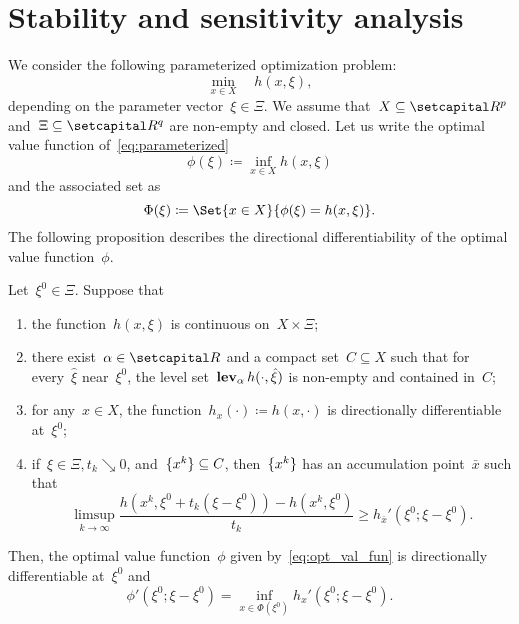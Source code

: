 \documentclass[../main]{subfiles}
\begin{document}
\section{Stability and sensitivity analysis}
We consider the following parameterized optimization problem:
\[ \label{eq:parameterized}
    \min_{x \in X} \quad h(x, \xi)
,\] 
depending on the parameter vector~$\xi \in \Xi$.
We assume that~$X \subseteq \setR^p$ and~$\Xi \subseteq \setR^q$ are non-empty and closed.
Let us write the optimal value function of~\cref{eq:parameterized}
\[ \label{eq:opt_val_fun}
    \phi(\xi) \coloneqq \inf_{x \in X} h(x, \xi)
\] 
and the associated set as
\[ \label{eq:opt_sol_map}
    \Phi(\xi) \coloneqq \Set{x \in X}{\phi(\xi) = h(x, \xi)}
.\] 
The following proposition describes the directional differentiability of the optimal value function~$\phi$.
\begin{proposition} \label{thm:sensitivity}
    Let~$\xi^0 \in \Xi$.
    Suppose that
    \begin{enumerate}
        \item the function~$h(x, \xi)$ is continuous on~$X \times \Xi$;
        \item there exist~$\alpha \in \setR$ and a compact set~$C \subseteq X$ such that for every~$\hat{\xi}$ near~$\xi^0$, the level set~$\operatorname{\mathbf{lev}}_\alpha h(\cdot, \hat{\xi})$ is non-empty and contained in~$C$;
        \item for any~$x \in X$, the function~$h_x(\cdot) \coloneqq h(x, \cdot)$ is directionally differentiable at~$\xi^0$;
        \item if~$\xi \in \Xi, t_k \searrow 0$, and~$\lbrace x^k\rbrace \subseteq C$, then~$\lbrace x^k\rbrace$ has an accumulation point~$\bar{x}$ such that
            \[
                \limsup_{k \to \infty} \frac{h(x^k, \xi^0 + t_k(\xi - \xi^0)) - h(x^k, \xi^0)}{t_k} \ge h_{\bar{x}}'(\xi^0; \xi - \xi^0)
            .\] 
    \end{enumerate}
    Then, the optimal value function~$\phi$ given by~\cref{eq:opt_val_fun} is directionally differentiable at~$\xi^0$ and
    \[
        \phi'(\xi^0; \xi - \xi^0) = \inf_{x \in \Phi(\xi^0)} h_x'(\xi^0; \xi - \xi^0)
    .\] 
\end{proposition}
\end{document}
